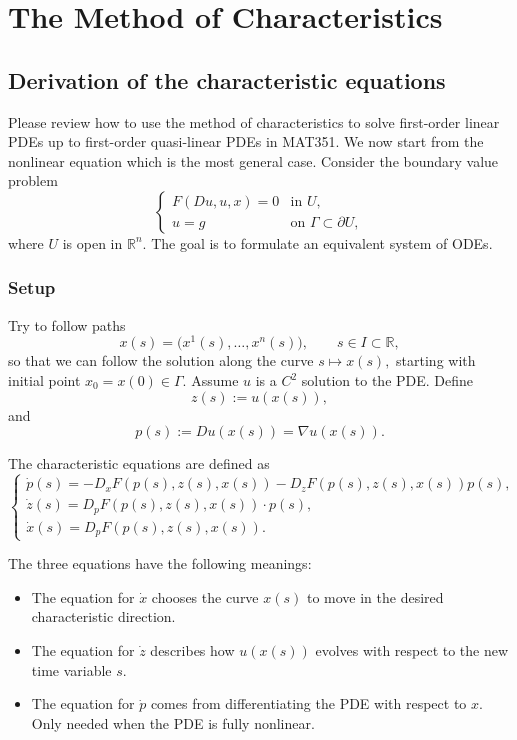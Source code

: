 \chapter{The Method of Characteristics}

\section{Derivation of the characteristic equations}

Please review how to use the method of characteristics to solve first-order linear PDEs up to first-order quasi-linear PDEs in MAT351.
We now start from the nonlinear equation which is the most general case.
Consider the boundary value problem
$$
\begin{cases}
F(Du,u,x)=0 & \text{in } U,\\
u=g & \text{on } \Gamma\subset \partial U,
\end{cases}
$$
where $U$ is open in $\mathbb{R}^n$.
The goal is to formulate an equivalent system of ODEs.

\subsection*{Setup}
Try to follow paths
$$
x(s)=\bigl(x^1(s),\ldots,x^n(s)\bigr), \qquad s\in I\subset \mathbb{R},
$$
so that we can follow the solution along the curve
$
s\mapsto x(s),
$
starting with initial point
$
x_0=x(0)\in \Gamma.
$
Assume $u$ is a $C^2$ solution to the PDE. Define
$$
z(s):=u(x(s)),
$$
and
$$
p(s):=Du(x(s))=\nabla u(x(s)).
$$
\begin{definition}
    The characteristic equations are defined as
    $$
    \begin{cases}
    \dot{p}(s)
    =
    -D_xF(p(s),z(s),x(s))
    -
    D_zF(p(s),z(s),x(s))p(s),
    \\[0.5em]
    \dot{z}(s)
    =
    D_pF(p(s),z(s),x(s))\cdot p(s),
    \\[0.5em]
    \dot{x}(s)
    =
    D_pF(p(s),z(s),x(s)).
    \end{cases}
    $$
\end{definition}

\begin{remark}
The three equations have the following meanings:
\begin{itemize}
    \item The equation for $\dot{x}$ chooses the curve $x(s)$ to move in the desired characteristic direction.
    \item The equation for $\dot{z}$ describes how $u(x(s))$ evolves with respect to the new time variable $s$.
    \item The equation for $\dot{p}$ comes from differentiating the PDE with respect to $x$. Only needed when the PDE is fully nonlinear.
\end{itemize}
\end{remark}


